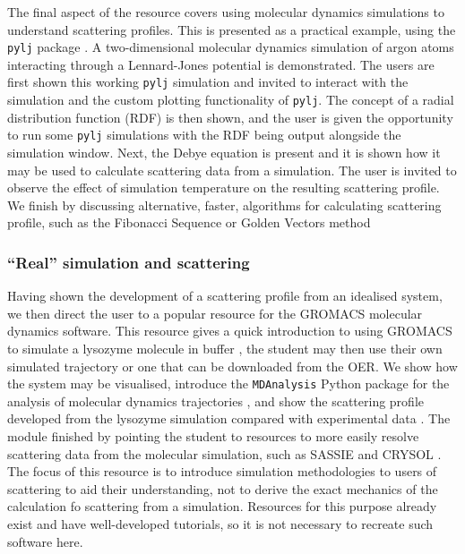The final aspect of the resource covers using molecular dynamics simulations to understand scattering profiles.
This is presented as a practical example, using the \texttt{pylj} package \cite{mccluskey_pylj_2018,mccluskey_arm61/pylj_2019-2}.
A two-dimensional molecular dynamics simulation of argon atoms interacting through a Lennard-Jones potential is demonstrated.
The users are first shown this working \texttt{pylj} simulation and invited to interact with the simulation and the custom plotting functionality of \texttt{pylj}.
The concept of a radial distribution function (RDF) is then shown, and the user is given the opportunity to run some \texttt{pylj} simulations with the RDF being output alongside the simulation window.
Next, the Debye equation \cite{debye_zerstreuung_1915} is present and it is shown how it may be used to calculate scattering data from a simulation.
The user is invited to observe the effect of simulation temperature on the resulting scattering profile.
We finish by discussing alternative, faster, algorithms for calculating scattering profile, such as the Fibonacci Sequence or Golden Vectors method \cite{watson_rapid_2013,svergun_solution_1994}

\subsubsection{``Real'' simulation and scattering}

Having shown the development of a scattering profile from an idealised system, we then direct the user to a popular resource for the GROMACS \cite{berendsen_gromacs_1995} molecular dynamics software.
This resource gives a quick introduction to using GROMACS to simulate a lysozyme molecule in buffer \cite{lemkul_gromacs_nodate}, the student may then use their own simulated trajectory or one that can be downloaded from the OER.
We show how the system may be visualised, introduce the \texttt{MDAnalysis} Python package for the analysis of molecular dynamics trajectories \cite{michaud-agrawal_mdanalysis_2011,gowers_mdanalysis_2016}, and show the scattering profile developed from the lysozyme simulation compared with experimental data \cite{franke_correlation_2015}.
The module finished by pointing the student to resources to more easily resolve scattering data from the molecular simulation, such as SASSIE and CRYSOL \cite{perkins_atomistic_2016,svergun_crysol_1995}.
The focus of this resource is to introduce simulation methodologies to users of scattering to aid their understanding, not to derive the exact mechanics of the calculation fo scattering from a simulation.
Resources for this purpose already exist and have well-developed tutorials, so it is not necessary to recreate such software here.
